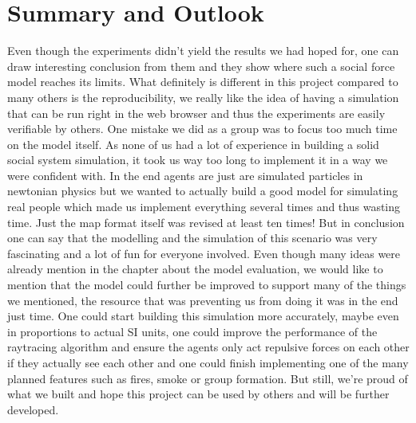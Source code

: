 \documentclass[11pt]{article}
\begin{document}
\section{Summary and Outlook}
Even though the experiments didn't yield the results we had hoped for, one can draw interesting conclusion from them and they show where such a social force model reaches its limits. What definitely is different in this project compared to many others is the reproducibility, we really like the idea of having a simulation that can be run right in the web browser and thus the experiments are easily verifiable by others. One mistake we did as a group was to focus too much time on the model itself. As none of us had a lot of experience in building a solid social system simulation, it took us way too long to implement it in a way we were confident with. In the end agents are just are simulated particles in newtonian physics but we wanted to actually build a good model for simulating real people which made us implement everything several times and thus wasting time. Just the map format itself was revised at least ten times! But in conclusion one can say that the modelling and the simulation of this scenario was very fascinating and a lot of fun for everyone involved. Even though many ideas were already mention in the chapter about the model evaluation, we would like to mention that the model could further be improved to support many of the things we mentioned, the resource that was preventing us from doing it was in the end just time. One could start building this simulation more accurately, maybe even in proportions to actual SI units, one could improve the performance of the raytracing algorithm and ensure the agents only act repulsive forces on each other if they actually see each other and one could finish implementing one of the many planned features such as fires, smoke or group formation. But still, we're proud of what we built and hope this project can be used by others and will be further developed.





\end{document}
